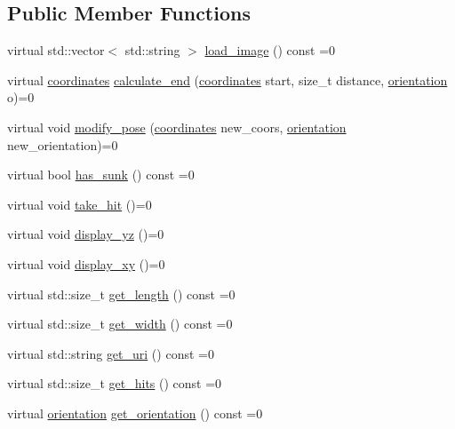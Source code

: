 \subsection*{Public Member Functions}
\begin{DoxyCompactItemize}
\item 
virtual std\+::vector$<$ std\+::string $>$ \hyperlink{classbattle__ship_1_1piece_aad848540970833ae5eadd115cc531b6b}{load\+\_\+image} () const =0
\item 
virtual \hyperlink{structbattle__ship_1_1coordinates}{coordinates} \hyperlink{classbattle__ship_1_1piece_a58092f7b1d663471204d7e51e68bbb2d}{calculate\+\_\+end} (\hyperlink{structbattle__ship_1_1coordinates}{coordinates} start, size\+\_\+t distance, \hyperlink{namespacebattle__ship_aed87488f0a73f0d0679fe343fb61c784}{orientation} o)=0
\item 
virtual void \hyperlink{classbattle__ship_1_1piece_a052305c855625732d3e5ba96d0fca5f9}{modify\+\_\+pose} (\hyperlink{structbattle__ship_1_1coordinates}{coordinates} new\+\_\+coors, \hyperlink{namespacebattle__ship_aed87488f0a73f0d0679fe343fb61c784}{orientation} new\+\_\+orientation)=0
\item 
virtual bool \hyperlink{classbattle__ship_1_1piece_af22bd781f4206decd0beed89b014d1cc}{has\+\_\+sunk} () const =0
\item 
virtual void \hyperlink{classbattle__ship_1_1piece_a77642906503e12eb22fcfbc3eab98cb5}{take\+\_\+hit} ()=0
\item 
virtual void \hyperlink{classbattle__ship_1_1piece_ad46ddc76d6e682a4f1fc8965a0c7813c}{display\+\_\+yz} ()=0
\item 
virtual void \hyperlink{classbattle__ship_1_1piece_a0f900b13641277ae9e809e4baa5c8c10}{display\+\_\+xy} ()=0
\item 
virtual std\+::size\+\_\+t \hyperlink{classbattle__ship_1_1piece_a08cfb1d99d1804f42f87878bef19e7ff}{get\+\_\+length} () const =0
\item 
virtual std\+::size\+\_\+t \hyperlink{classbattle__ship_1_1piece_a680897abc6ae9c5e187003a1c24fc9a1}{get\+\_\+width} () const =0
\item 
virtual std\+::string \hyperlink{classbattle__ship_1_1piece_aeba6c5083cb05200850cee7578a81d09}{get\+\_\+uri} () const =0
\item 
virtual std\+::size\+\_\+t \hyperlink{classbattle__ship_1_1piece_a27116e62c4ee91796349bbcb284e446d}{get\+\_\+hits} () const =0
\item 
virtual \hyperlink{namespacebattle__ship_aed87488f0a73f0d0679fe343fb61c784}{orientation} \hyperlink{classbattle__ship_1_1piece_a2cc01b1ec66bfb91df048401233e9618}{get\+\_\+orientation} () const =0

\end{DoxyCompactItemize}

